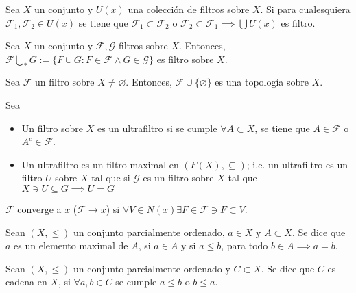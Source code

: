 \documentclass[a4paper, 12pt]{article}
\begin{document}
\begin{teorema}
    Sea $X$ un conjunto y $U(x)$ una colección de filtros sobre $X$. Si para cualesquiera $\mathcal{F}_1,\mathcal{F}_2\in U(x)$ se tiene que $\mathcal{F}_1\subset \mathcal{F}_2$ o $\mathcal{F}_2\subset \mathcal{F}_1\implies \bigcup U(x)$ es filtro. 
\end{teorema}

\begin{prop}
    Sea $X$ un conjunto y $\mathcal{F}, \mathcal{G}$ filtros sobre $X$. Entonces, $\mathcal{F}\bigcup_* G:=\{F\cup G:F\in \mathcal{F}\wedge G\in \mathcal{G}\}$ es filtro sobre $X$. 
\end{prop}


\begin{cajita}
    \begin{nota}[Escolio]
        Sea $\mathcal{F}$ un filtro sobre $X\neq\varnothing$. Entonces,  $\mathcal{F}\cup \{\varnothing\}$ es una topología sobre $X$. 
    \end{nota}    
\end{cajita}

\begin{definicion}[Ultrafiltros]
    Sea 
    \begin{itemize}
        \item Un filtro sobre $X$ es un ultrafiltro  si se cumple $\forall A\subset X $, se tiene que $A\in \mathcal{F}$ o $A^c\in \mathcal{F}$.
        \item Un ultrafiltro es un filtro maximal en $(F(X), \subseteq)$; i.e. un ultrafiltro es un filtro $U$ sobre $X$ tal que si $\mathcal{G}$ es un filtro sobre $X$ tal que $X\ni U\subseteq G\implies U=G$ 
    \end{itemize}
\end{definicion}

\begin{definicion}
    $\mathcal{F}$ converge a $x$ ($\mathcal{F}\to x$) si $\forall V\in N(x)\exists F\in \mathcal{F}\ni F\subset V$. 
\end{definicion}

\begin{definicion}
    Sean $(X,\leq)$ un conjunto parcialmente ordenado, $a\in X$ y $A\subset X$. Se dice que $a$ es un elemento maximal de $A$, si $a\in A$ y si $a\leq b$, para todo $b\in A\implies a=b$.  
\end{definicion}

\begin{definicion}
    Sean $(X,\leq)$ un conjunto parcialmente ordenado y $C\subset X$. Se dice que $C$ es cadena en $X$, si $\forall a,b\in C$ se cumple $a\leq b$ o $b\leq a$.  
\end{definicion}
\end{document}
